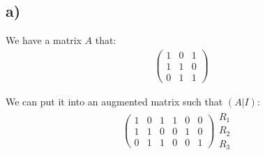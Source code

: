 \documentclass[11pt]{article}
\begin{document}
\subsection{a)}
We have a matrix $A$ that:
\begin{align*}
\left(\begin{array}{ccc}
1 & 0 & 1 \\
1 & 1 & 0 \\
0 & 1 & 1
\end{array}\right)
\end{align*}

We can put it into an augmented matrix such that $(A|I)$:
\begin{align*}
\left(\begin{array}{ccc|ccc}
1 & 0 & 1 & 1 & 0 & 0 \\
1 & 1 & 0 & 0 & 1 & 0 \\
0 & 1 & 1 & 0 & 0 & 1
\end{array}\right)
\begin{array}{l}
  \text{$R_1$}\\
  \text{$R_2$}\\
  \text{$R_3$ }
\end{array}
\end{align*}
\end{document}
